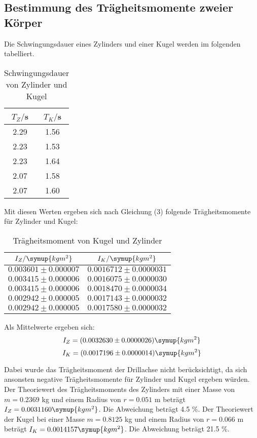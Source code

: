 \subsection{Bestimmung des Trägheitsmomente zweier Körper}
Die Schwingungsdauer eines Zylinders und einer Kugel werden im folgenden tabelliert.
\begin{table}[H]
  \centering
  \caption{Schwingungsdauer von Zylinder und Kugel}
  \label{tab:Schwingungsdauer von Zylinder und Kugel}
  \begin{tabular}{c c}
    \toprule
    $T_Z/$s & $T_K/$s \\
    \midrule
    2.29 & 1.56 \\
    2.23 & 1.53 \\
    2.23 & 1.64 \\
    2.07 & 1.58 \\
    2.07 & 1.60 \\
    \bottomrule
  \end{tabular}
\end{table}

Mit diesen Werten ergeben sich nach Gleichung (3) folgende Trägheitsmomente
für Zylinder und Kugel:
\begin{table}[H]
  \centering
  \caption{Trägheitsmoment von Kugel und Zylinder}
  \label{tab:Trägheitsmoment von Kugel und Zylinder}
  \begin{tabular}{c c}
    \toprule
    $I_Z/\symup{kgm^2}$ & $I_K/\symup{kgm^2}$ \\
    \midrule
    $0.003601 \pm 0.000007$ & $0.0016712 \pm 0.0000031$ \\
    $0.003415 \pm 0.000006$ & $0.0016075 \pm 0.0000030$ \\
    $0.003415 \pm 0.000006$ & $0.0018470 \pm 0.0000034$ \\
    $0.002942 \pm 0.000005$ & $0.0017143 \pm 0.0000032$ \\
    $0.002942 \pm 0.000005$ & $0.0017580 \pm 0.0000032$ \\
    \bottomrule
  \end{tabular}
\end{table}

Als Mittelwerte ergeben sich:
\begin{equation}
  I_Z = (0.0032630 \pm 0.0000026) \symup{kgm^2}
\end{equation}
\begin{equation}
  I_K = (0.0017196 \pm 0.0000014) \symup{kgm^2}
\end{equation}

Dabei wurde das Trägheitsmoment der Drillachse nicht berücksichtigt, da sich
ansonsten negative Trägheitsmomente für Zylinder und Kugel ergeben würden.
Der Theoriewert des Trägheitsmoments des Zylinders mit einer Masse von $m=0.2369$ kg und einem Radius von
$r=0.051$ m beträgt $I_Z = 0.0031160 \symup{kgm^2}$. Die Abweichung beträgt 4.5 \%.
Der Theoriewert der Kugel bei einer Masse $m = 0.8125$ kg und einem Radius von $r = 0.066$ m
beträgt $I_K = 0.0014157 \symup{kgm^2}$. Die Abweichung beträgt 21.5 \%.


